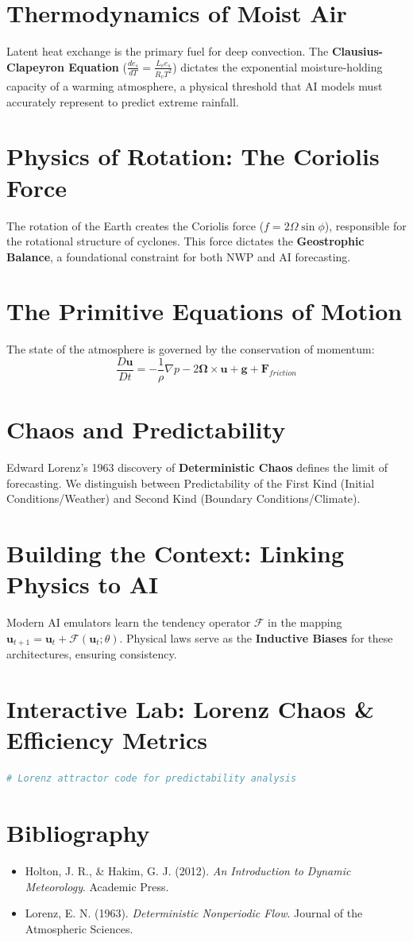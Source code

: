 \section{Thermodynamics of Moist Air}
Latent heat exchange is the primary fuel for deep convection. The \textbf{Clausius-Clapeyron Equation} ($\frac{de_s}{dT} = \frac{L_v e_s}{R_v T^2}$) dictates the exponential moisture-holding capacity of a warming atmosphere, a physical threshold that AI models must accurately represent to predict extreme rainfall.

\section{Physics of Rotation: The Coriolis Force}
The rotation of the Earth creates the Coriolis force ($f = 2\Omega \sin\phi$), responsible for the rotational structure of cyclones. This force dictates the \textbf{Geostrophic Balance}, a foundational constraint for both NWP and AI forecasting.

\section{The Primitive Equations of Motion}
The state of the atmosphere is governed by the conservation of momentum:
\begin{equation}
\frac{D \mathbf{u}}{Dt} = -\frac{1}{\rho}\nabla p - 2\mathbf{\Omega} \times \mathbf{u} + \mathbf{g} + \mathbf{F}_{friction}
\end{equation}

\section{Chaos and Predictability}
Edward Lorenz's 1963 discovery of \textbf{Deterministic Chaos} defines the limit of forecasting. We distinguish between Predictability of the First Kind (Initial Conditions/Weather) and Second Kind (Boundary Conditions/Climate).

\section{Building the Context: Linking Physics to AI}
Modern AI emulators learn the tendency operator $\mathcal{F}$ in the mapping $\mathbf{u}_{t+1} = \mathbf{u}_t + \mathcal{F}(\mathbf{u}_t; \theta)$. Physical laws serve as the \textbf{Inductive Biases} for these architectures, ensuring consistency.

\section{Interactive Lab: Lorenz Chaos & Efficiency Metrics}
\begin{lstlisting}[language=Python, caption=Simulating the Lorenz Attractor]
# Lorenz attractor code for predictability analysis
\end{lstlisting}

\section*{Bibliography}
\begin{itemize}
    \item Holton, J. R., \& Hakim, G. J. (2012). \textit{An Introduction to Dynamic Meteorology}. Academic Press.
    \item Lorenz, E. N. (1963). \textit{Deterministic Nonperiodic Flow}. Journal of the Atmospheric Sciences.
\end{itemize}
